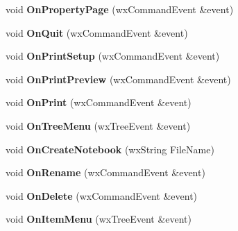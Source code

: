 \begin{DoxyCompactItemize}
\item 
\hypertarget{class_my_frame_a5ebc2b26f4d86a1d0c29166ce6ce0996}{void {\bfseries On\+Property\+Page} (wx\+Command\+Event \&event)}\label{class_my_frame_a5ebc2b26f4d86a1d0c29166ce6ce0996}

\item 
\hypertarget{class_my_frame_a9e6c4824efad3aa9f4c3a3025a616e2d}{void {\bfseries On\+Quit} (wx\+Command\+Event \&event)}\label{class_my_frame_a9e6c4824efad3aa9f4c3a3025a616e2d}

\item 
\hypertarget{class_my_frame_ab9201004e1b94d87e4915507da4628e4}{void {\bfseries On\+Print\+Setup} (wx\+Command\+Event \&event)}\label{class_my_frame_ab9201004e1b94d87e4915507da4628e4}

\item 
\hypertarget{class_my_frame_a30d3a65aad431cb6d359a21e6b01f59c}{void {\bfseries On\+Print\+Preview} (wx\+Command\+Event \&event)}\label{class_my_frame_a30d3a65aad431cb6d359a21e6b01f59c}

\item 
\hypertarget{class_my_frame_a9b8443902bcd3be93a9103ede4247473}{void {\bfseries On\+Print} (wx\+Command\+Event \&event)}\label{class_my_frame_a9b8443902bcd3be93a9103ede4247473}

\item 
\hypertarget{class_my_frame_af36bfa551701f6d4e013182ffad407e5}{void {\bfseries On\+Tree\+Menu} (wx\+Tree\+Event \&event)}\label{class_my_frame_af36bfa551701f6d4e013182ffad407e5}

\item 
\hypertarget{class_my_frame_afc88a438cc4c6f1dd00a10e1836cb2e2}{void {\bfseries On\+Create\+Notebook} (wx\+String File\+Name)}\label{class_my_frame_afc88a438cc4c6f1dd00a10e1836cb2e2}

\item 
\hypertarget{class_my_frame_ac8b68e5ef6840b76a581fd6609b52a40}{void {\bfseries On\+Rename} (wx\+Command\+Event \&event)}\label{class_my_frame_ac8b68e5ef6840b76a581fd6609b52a40}

\item 
\hypertarget{class_my_frame_afa839d6dfb12f69cd8d5089af39754a6}{void {\bfseries On\+Delete} (wx\+Command\+Event \&event)}\label{class_my_frame_afa839d6dfb12f69cd8d5089af39754a6}

\item 
\hypertarget{class_my_frame_a8dc1c452bab299dacc6ddaf52b581986}{void {\bfseries On\+Item\+Menu} (wx\+Tree\+Event \&event)}\label{class_my_frame_a8dc1c452bab299dacc6ddaf52b581986}


\end{DoxyCompactItemize}
